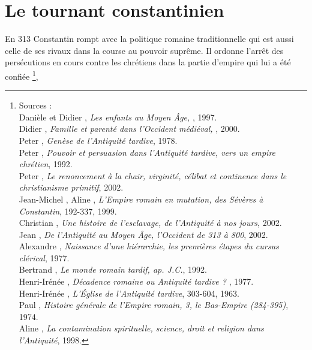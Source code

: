 

\chapter{Le tournant constantinien}


En 313  Constantin rompt avec la politique romaine traditionnelle qui est aussi celle de ses rivaux dans la course au pouvoir suprême. Il ordonne l'arrêt des persécutions en cours contre les chrétiens dans la partie d'empire qui lui a été confiée \footnote{Sources :
\\Danièle  et Didier , \emph{Les enfants au Moyen Âge, }, 1997.
\\Didier {}, \emph{Famille et parenté dans l'Occident médiéval, }, 2000.
\\Peter {}, \emph{Genèse de l'Antiquité tardive}, 1978.
\\Peter {}, \emph{Pouvoir et persuasion dans l'Antiquité tardive, vers un empire chrétien}, 1992.
\\Peter {}, \emph{Le renoncement à la chair, virginité, célibat et continence dans le christianisme primitif}, 2002.
\\Jean-Michel , Aline , \emph{L'Empire romain en mutation, des Sévères à Constantin}, 192-337, 1999.
\\Christian {}, \emph{Une histoire de l'esclavage, de l'Antiquité à nos jours}, 2002.
\\Jean {}, \emph{De l'Antiquité au Moyen Âge, l'Occident de 313 à 800}, 2002.
\\Alexandre {}, \emph{Naissance d'une hiérarchie, les premières étapes du cursus clérical}, 1977.
\\Bertrand {}, \emph{Le monde romain tardif,  ap. J.C.}, 1992.
\\Henri-Irénée , \emph{Décadence romaine ou Antiquité tardive ? }, 1977.
\\Henri-Irénée , \emph{L'Église de l'Antiquité tardive}, 303-604, 1963.
\\Paul {}, \emph{Histoire générale de l'Empire romain, 3, le Bas-Empire (284-395)}, 1974.
\\Aline {}, \emph{La contamination spirituelle, science, droit et religion dans l'Antiquité}, 1998.},
